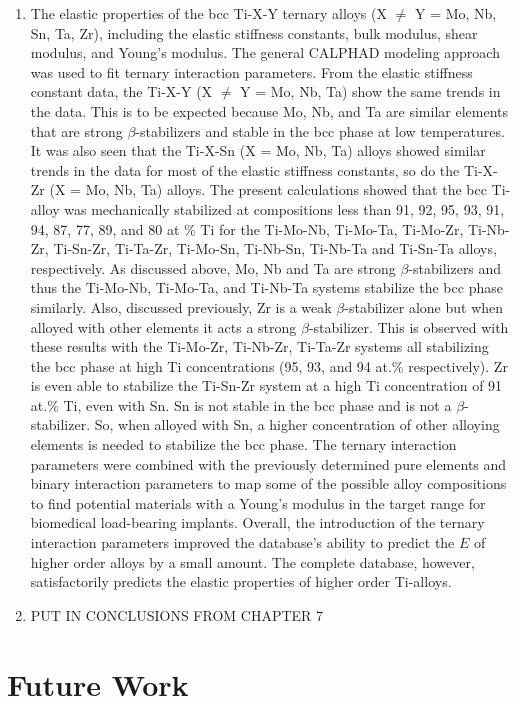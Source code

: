 \begin{enumerate}
	\item The elastic properties of the bcc Ti-X-Y ternary alloys (X $\neq$ Y = Mo, Nb, Sn, Ta, Zr), including the elastic stiffness constants, bulk modulus, shear modulus, and Young's modulus. The general CALPHAD modeling approach was used to fit ternary interaction parameters. From the elastic stiffness constant data, the Ti-X-Y (X $\neq$ Y = Mo, Nb, Ta) show the same trends in the data. This is to be expected because Mo, Nb, and Ta are similar elements that are strong $\beta$-stabilizers and stable in the bcc phase at low temperatures. It was also seen that the Ti-X-Sn (X = Mo, Nb, Ta) alloys showed similar trends in the data for most of the elastic stiffness constants, so do the Ti-X-Zr (X = Mo, Nb, Ta) alloys. The present calculations showed that the bcc Ti-alloy was mechanically stabilized at compositions less than 91, 92, 95, 93, 91, 94, 87, 77, 89, and 80 at \% Ti for the Ti-Mo-Nb, Ti-Mo-Ta, Ti-Mo-Zr, Ti-Nb-Zr, Ti-Sn-Zr, Ti-Ta-Zr, Ti-Mo-Sn, Ti-Nb-Sn, Ti-Nb-Ta and Ti-Sn-Ta alloys, respectively. As discussed above, Mo, Nb and Ta are strong $\beta$-stabilizers and thus the Ti-Mo-Nb, Ti-Mo-Ta, and Ti-Nb-Ta systems stabilize the bcc phase similarly. Also, discussed previously, Zr is a weak $\beta$-stabilizer alone but when alloyed with other elements it acts a strong $\beta$-stabilizer. This is observed with these results with the Ti-Mo-Zr, Ti-Nb-Zr, Ti-Ta-Zr systems all stabilizing the bcc phase at high Ti concentrations (95, 93, and 94 at.\% respectively). Zr is even able to stabilize the Ti-Sn-Zr system at a high Ti concentration of 91 at.\% Ti, even with Sn. Sn is not stable in the bcc phase and is not a $\beta$-stabilizer. So, when alloyed with Sn, a higher concentration of other alloying elements is needed to stabilize the bcc phase. The ternary interaction parameters were combined with the previously determined pure elements and binary interaction parameters to map some of the possible alloy compositions to find potential materials with a Young's modulus in the target range for biomedical load-bearing implants. Overall, the introduction of the ternary interaction parameters improved the database's ability to predict the $E$ of higher order alloys by a small amount. The complete database, however, satisfactorily predicts the elastic properties of higher order Ti-alloys.
	\item PUT IN CONCLUSIONS FROM CHAPTER 7
\end{enumerate}

\section{Future Work}

